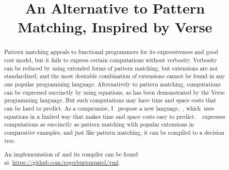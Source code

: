 \documentclass[manuscript,screen 12pt, nonacm]{acmart}
\title{An Alternative to Pattern Matching, Inspired by Verse}
\begin{document}
\begin{abstract}
    Pattern matching %
    appeals %
    to functional programmers for its expressiveness and good cost model, 
    but 
    it %
    fails to express %
    certain computations without verbosity. Verbosity %
    can be reduced %
    by using extended forms of pattern matching,
    but extensions %
    are %
    not standardized, and the most desirable combination of extensions cannot be
    found in any one popular programming language. Alternatively to pattern
    matching, computations can be expressed succinctly by using equations, as
    has been demonstrated by the Verse programming language. But such
    computations may have time and space costs that can be hard to predict. 
    As a compromise, 
    I %
    ~propose %
     a 
    new language,~\VMinus, %
    which~uses equations in a limited way that makes time and space costs easy
    to predict. 
    \VMinus~ %
    expresses %
    computations as succinctly as pattern matching with popular extensions in
    comparative examples, and just like pattern matching, it %
    can be compiled %
    to a decision tree. 
    
    An implementation of~\VMinus and its compiler can be found
    at~\url{https://github.com/rogerburtonpatel/vml}.
\end{abstract}

\maketitle
\end{document}
